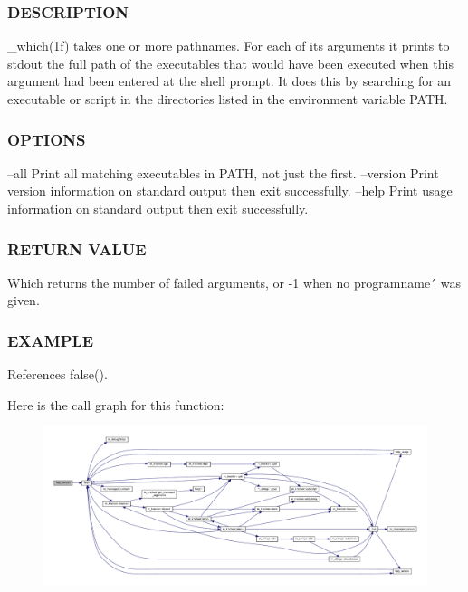 \subsubsection*{D\+E\+S\+C\+R\+I\+P\+T\+I\+ON}

\+\_\+which(1f) takes one or more pathnames. For each of its arguments it prints to stdout the full path of the executables that would have been executed when this argument had been entered at the shell prompt. It does this by searching for an executable or script in the directories listed in the environment variable P\+A\+TH.

\subsubsection*{O\+P\+T\+I\+O\+NS}

--all Print all matching executables in P\+A\+TH, not just the first. --version Print version information on standard output then exit successfully. --help Print usage information on standard output then exit successfully.

\subsubsection*{R\+E\+T\+U\+RN V\+A\+L\+UE}

Which returns the number of failed arguments, or -\/1 when no programname´ was given.

\subsubsection*{E\+X\+A\+M\+P\+LE}

References false().

Here is the call graph for this function\+:
\nopagebreak
\begin{figure}[H]
\begin{center}
\leavevmode
\includegraphics[width=350pt]{__which_8f90_a39c21619b08a3c22f19e2306efd7f766_cgraph}
\end{center}
\end{figure}
